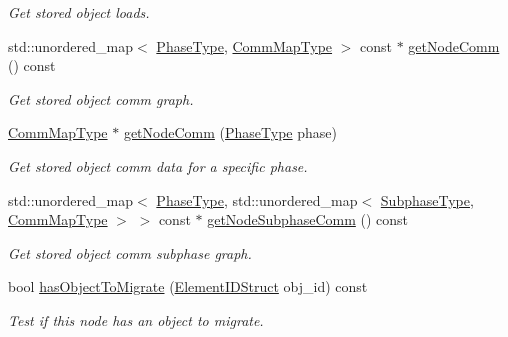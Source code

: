 \begin{DoxyCompactItemize}
\begin{DoxyCompactList}\small\item\em Get stored object loads. \end{DoxyCompactList}\item 
std\+::unordered\+\_\+map$<$ \hyperlink{namespacevt_a46ce6733d5cdbd735d561b7b4029f6d7}{Phase\+Type}, \hyperlink{namespacevt_1_1vrt_1_1collection_1_1balance_a01ee1fb0ae2da1d2ab7fdca3be9ae351}{Comm\+Map\+Type} $>$ const  $\ast$ \hyperlink{structvt_1_1vrt_1_1collection_1_1balance_1_1_node_l_b_data_a01ac3980585c93769570fd4e76ea9218}{get\+Node\+Comm} () const
\begin{DoxyCompactList}\small\item\em Get stored object comm graph. \end{DoxyCompactList}\item 
\hyperlink{namespacevt_1_1vrt_1_1collection_1_1balance_a01ee1fb0ae2da1d2ab7fdca3be9ae351}{Comm\+Map\+Type} $\ast$ \hyperlink{structvt_1_1vrt_1_1collection_1_1balance_1_1_node_l_b_data_a6805869aeb1d424289ddb2b6be653595}{get\+Node\+Comm} (\hyperlink{namespacevt_a46ce6733d5cdbd735d561b7b4029f6d7}{Phase\+Type} phase)
\begin{DoxyCompactList}\small\item\em Get stored object comm data for a specific phase. \end{DoxyCompactList}\item 
std\+::unordered\+\_\+map$<$ \hyperlink{namespacevt_a46ce6733d5cdbd735d561b7b4029f6d7}{Phase\+Type}, std\+::unordered\+\_\+map$<$ \hyperlink{namespacevt_ae78cbfdf1e57470e33eedb074f2beeba}{Subphase\+Type}, \hyperlink{namespacevt_1_1vrt_1_1collection_1_1balance_a01ee1fb0ae2da1d2ab7fdca3be9ae351}{Comm\+Map\+Type} $>$ $>$ const  $\ast$ \hyperlink{structvt_1_1vrt_1_1collection_1_1balance_1_1_node_l_b_data_a783e8620fff1016d7073a3747379127f}{get\+Node\+Subphase\+Comm} () const
\begin{DoxyCompactList}\small\item\em Get stored object comm subphase graph. \end{DoxyCompactList}\item 
bool \hyperlink{structvt_1_1vrt_1_1collection_1_1balance_1_1_node_l_b_data_af025247a42d9b3ff6ba476714aad42fa}{has\+Object\+To\+Migrate} (\hyperlink{namespacevt_1_1vrt_1_1collection_1_1balance_a9f5b53fafb270212279a4757d2c4cd28}{Element\+I\+D\+Struct} obj\+\_\+id) const
\begin{DoxyCompactList}\small\item\em Test if this node has an object to migrate. \end{DoxyCompactList}\item 

\end{DoxyCompactItemize}
